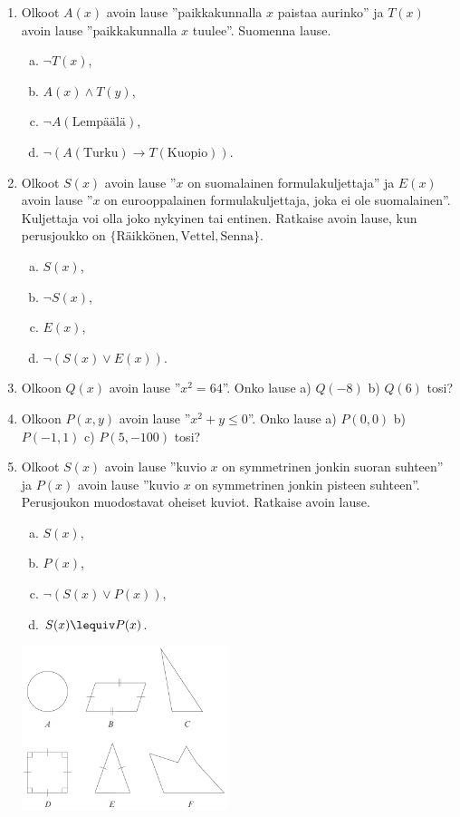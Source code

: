 \begin{enumerate}
\item
Olkoot $A(x)$ avoin lause ''paikkakunnalla $x$ paistaa
aurinko'' ja $T(x)$ avoin lause ''paikkakunnalla $x$
tuulee''. Suomenna lause.
\begin{enumerate}[a)]
\item $\lnot T(x)$,
\item $A(x) \land T(y)$,
\item $\lnot A(\textrm{Lempäälä})$,
\item $\lnot (A(\textrm{Turku}) \to T(\textrm{Kuopio}))$.
\end{enumerate}

\item
Olkoot $S(x)$ avoin lause ''$x$ on suomalainen
formulakuljettaja'' ja $E(x)$ avoin lause ''$x$ on
eurooppalainen formulakuljettaja, joka ei ole
suomalainen''. Kuljettaja voi olla joko nykyinen tai
entinen. Ratkaise avoin lause, kun perusjoukko on
$\{\textrm{Räikkönen}, \textrm{Vettel}, \textrm{Senna}\}$.
\begin{enumerate}[a)]
\item $S(x)$,
\item $\lnot S(x)$,
\item $E(x)$,
\item $\lnot (S(x) \lor E(x))$.
\end{enumerate}

\item
Olkoon $Q(x)$ avoin lause ''$x^2 = 64$''. Onko lause a)
$Q(-8)$ b) $Q(6)$ tosi?

\item
Olkoon $P(x, y)$ avoin lause ''$x^2 + y \le 0$''. Onko
lause a) $P(0, 0)$ b) $P(-1, 1)$ c) $P(5, -100)$ tosi?

\item
Olkoot $S(x)$ avoin lause ''kuvio $x$ on symmetrinen
jonkin suoran suhteen'' ja $P(x)$ avoin lause ''kuvio $x$
on symmetrinen jonkin pisteen suhteen''. Perusjoukon
muodostavat oheiset kuviot. Ratkaise avoin lause.
\begin{enumerate}[a)]
\item $S(x)$,
\item $P(x)$,
\item $\lnot (S(x) \lor P(x))$,
\item $S(x) \lequiv P(x)$.
\end{enumerate}

\begin{center}
\includegraphics[width=6cm]{pictures/kpl3_2_teht7}
\end{center}


\end{enumerate}
